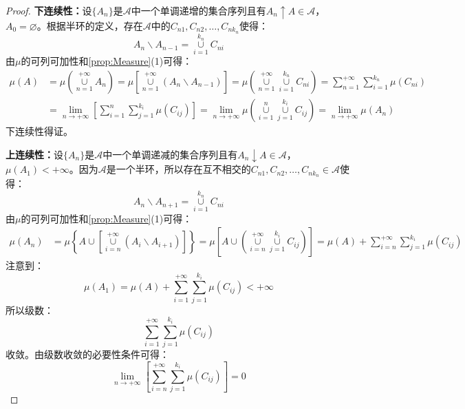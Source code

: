 \begin{proof}
	\textbf{下连续性：}设$\{A_n\}$是$\mathscr{A}$中一个单调递增的集合序列且有$A_n\uparrow A\in\mathscr{A}$，$A_0=\varnothing$。根据半环的定义，存在$\mathscr{A}$中的$C_{n1},C_{n2},\dots,C_{nk_n}$使得：
	\begin{equation*}
		A_n\backslash A_{n-1}=\underset{i=1}{\overset{k_n}{\cup}}C_{ni}
	\end{equation*}
	由$\mu$的可列可加性和\cref{prop:Measure}(1)可得：
	\begin{align*}
		\mu(A)&=\mu\left(\underset{n=1}{\overset{+\infty}{\cup}}A_n\right)
		=\mu\left[\underset{n=1}{\overset{+\infty}{\cup}}(A_{n}\backslash A_{n-1})\right]=\mu\left(\underset{n=1}{\overset{+\infty}{\cup}}\underset{i=1}{\overset{k_n}{\cup}}C_{ni}\right)=\sum_{n=1}^{+\infty}\sum_{i=1}^{k_n}\mu(C_{ni}) \\
		&=\lim_{n\to+\infty}\left[\sum_{i=1}^{n}\sum_{j=1}^{k_i}\mu(C_{ij})\right]=\lim_{n\to+\infty}\mu\left(\underset{i=1}{\overset{n}{\cup}}\underset{j=1}{\overset{k_i}{\cup}}C_{ij}\right)=\lim_{n\to+\infty}\mu(A_n)
	\end{align*}
	下连续性得证。\par
	\textbf{上连续性：}设$\{A_n\}$是$\mathscr{A}$中一个单调递减的集合序列且有$A_n\downarrow A\in\mathscr{A}$，$\mu(A_1)<+\infty$。因为$\mathscr{A}$是一个半环，所以存在互不相交的$C_{n1},C_{n2},\dots,C_{nk_n}\in \mathscr{A}$使得：
	\begin{equation*}
		A_n\backslash A_{n+1}=\underset{i=1}{\overset{k_n}{\cup}}C_{ni}
	\end{equation*}
	由$\mu$的可列可加性和\cref{prop:Measure}(1)可得：
	\begin{align*}
		\mu(A_n)&=\mu\left\{A\cup\left[\underset{i=n}{\overset{+\infty}{\cup}}(A_i\backslash A_{i+1})\right]\right\}=\mu\left[A\cup\left(\underset{i=n}{\overset{+\infty}{\cup}}\underset{j=1}{\overset{k_i}{\cup}}C_{ij}\right)\right]
		=\mu(A)+\sum_{i=n}^{+\infty}\sum_{j=1}^{k_i}\mu(C_{ij})
	\end{align*}
	注意到：
	\begin{equation*}
		\mu(A_1)=\mu(A)+\sum_{i=1}^{+\infty}\sum_{j=1}^{k_i}\mu(C_{ij})<+\infty
	\end{equation*}
	所以级数：
	\begin{equation*}
		\sum_{i=1}^{+\infty}\sum_{j=1}^{k_i}\mu(C_{ij})
	\end{equation*}
	收敛。由级数收敛的必要性条件可得：
	\begin{equation*}
		\lim_{n\to+\infty}\left[\sum_{i=n}^{+\infty}\sum_{j=1}^{k_i}\mu(C_{ij})\right]=0

\end{equation*}
\end{proof}
